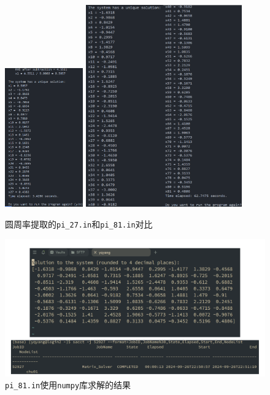 \begin{figure}[H]
	\centering
	\includegraphics[width=0.3\textwidth]{Problem 2/figs/pi_27.png}
	\vspace{5pt}
	\includegraphics[width=0.6\textwidth]{Problem 2/figs/pi_81.pdf}
	\caption{圆周率提取的\texttt{pi\_27.in}和\texttt{pi\_81.in}对比}
\end{figure}

\begin{figure}[H]
	\centering
	\includegraphics[width=1.0\textwidth]{Problem 2/figs/slurm.pdf}
	\caption{\texttt{pi\_81.in}使用\texttt{numpy}库求解的结果}
\end{figure}